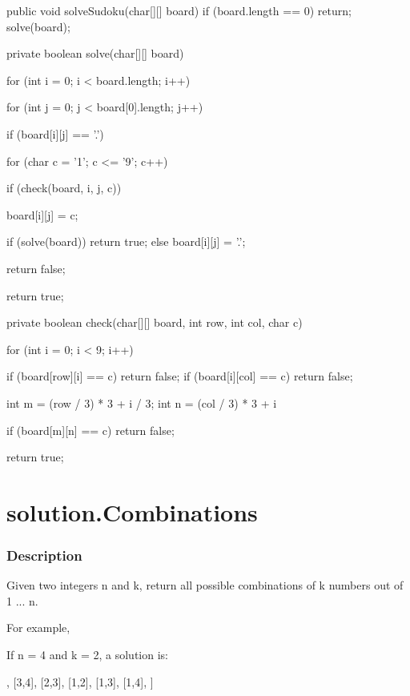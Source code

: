 \begin{Code}
public void solveSudoku(char[][] board) {
    if (board.length == 0) {
        return;
    }
    solve(board);
}

private boolean solve(char[][] board) {
    for (int i = 0; i < board.length; i++) {
        for (int j = 0; j < board[0].length; j++) {
            if (board[i][j] == '.') {
                for (char c = '1'; c <= '9'; c++) {
                    if (check(board, i, j, c)) {
                        board[i][j] = c;

                        if (solve(board)) {
                            return true;
                        } else {
                            board[i][j] = '.';
                        }
                    }
                }
                return false;
            }
        }
    }
    return true;
}
\end{Code}

\newpage

\begin{Code}
private boolean check(char[][] board, int row, int col, char c) {
    for (int i = 0; i < 9; i++) {
        if (board[row][i] == c) {
            return false;
        }
        if (board[i][col] == c) {
            return false;
        }

        int m = (row / 3) * 3 + i / 3;
        int n = (col / 3) * 3 + i %

        if (board[m][n] == c) {
            return false;
        }
    }
    return true;
}
\end{Code}

\newpage

\section{solution.Combinations} %

\subsubsection{Description}

Given two integers n and k, return all possible combinations of k numbers out of 1 ... n.

For example,

If n = 4 and k = 2, a solution is:
\begin{Code}
[
  [2,4],
  [3,4],
  [2,3],
  [1,2],
  [1,3],
  [1,4],
]
\end{Code}

